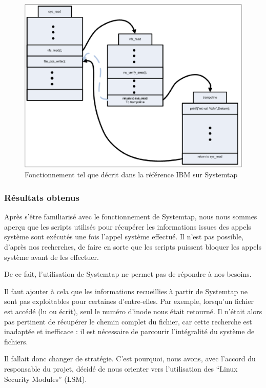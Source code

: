 \documentclass[pdftex,a4paper,titlepage,11pt]{article}
\begin{document}
\begin{figure}[hb]
	\centering
	\includegraphics[scale=0.4]{attachements/kretprob.png}
	\caption{Fonctionnement tel que décrit dans la référence IBM sur Systemtap \cite{IBMRBST}}
\end{figure}

\subsubsection{Résultats obtenus}

Après s'être familiarisé avec le fonctionnement de Systemtap, nous nous sommes aperçu que les scripts utilisés pour récupérer les informations issues des appels système sont exécutés une fois l'appel système effectué. Il n'est pas possible, d'après nos recherches, de faire en sorte que les scripts puissent bloquer les appels système avant de les effectuer.

De ce fait, l'utilisation de Systemtap ne permet pas de répondre à nos besoins.

Il faut ajouter à cela que les informations recueillies à partir de Systemtap ne sont pas exploitables pour certaines d'entre-elles. Par exemple, lorsqu'un fichier est accédé (lu ou écrit), seul le numéro d'inode nous était retourné. Il n'était alors pas pertinent de récupérer le chemin complet du fichier, car cette recherche est inadaptée et inefficace : il est nécessaire de parcourir l'intégralité du système de fichiers.

Il fallait donc changer de stratégie. C'est pourquoi, nous avons, avec l'accord du responsable du projet, décidé de nous orienter vers l'utilisation des ``Linux Security Modules'' (LSM).
\end{document}
